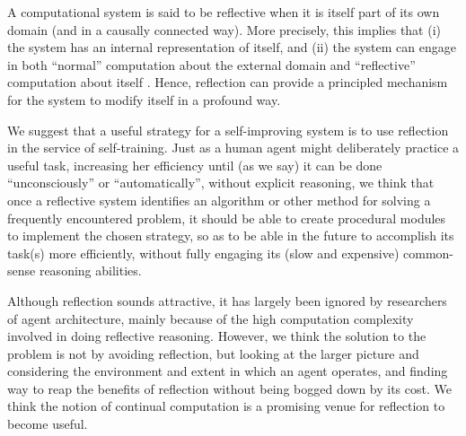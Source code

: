 \documentclass[]{llncs}
\begin{document}
A computational system is said to be reflective when it is itself part of
its own domain (and in a causally connected way).  More precisely, this
implies that (i) the system has an internal representation of itself, and
(ii) the system can engage in both {}``normal'' computation about the
external domain and {}``reflective'' computation about itself
\cite{maes1988:computational_reflection}.  Hence, reflection can provide a
principled mechanism for the system to modify itself in a profound way.

We suggest that a useful strategy for a self-improving system is to use
reflection in the service of self-training.  Just as a human agent might
deliberately practice a useful task, increasing her efficiency until (as we
say) it can be done ``unconsciously'' or ``automatically'', without
explicit reasoning, we think that once a reflective system identifies an
algorithm or other method for solving a frequently encountered problem, it
should be able to create procedural modules to implement the chosen
strategy, so as to be able in the future to accomplish its task(s) more
efficiently, without fully engaging its (slow and expensive) common-sense
reasoning abilities.

%


Although reflection sounds attractive, it has largely been ignored by
researchers of agent architecture, mainly because of the high computation
complexity involved in doing reflective reasoning.  However, we think the
solution to the problem is not by avoiding reflection, but looking at the
larger picture and considering the environment and extent in which an agent
operates, and finding way to reap the benefits of reflection without being
bogged down by its cost.  We think the notion of continual computation is a
promising venue for reflection to become useful.
\end{document}
